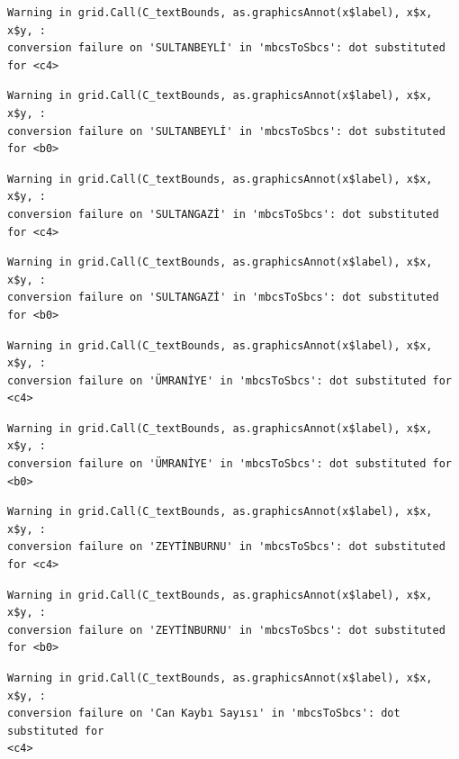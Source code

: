 \documentclass[
  11pt,
  a4paper,
  DIV=11,
  numbers=noendperiod]{scrartcl}
\begin{document}
\begin{verbatim}
Warning in grid.Call(C_textBounds, as.graphicsAnnot(x$label), x$x, x$y, :
conversion failure on 'SULTANBEYLİ' in 'mbcsToSbcs': dot substituted for <c4>
\end{verbatim}

\begin{verbatim}
Warning in grid.Call(C_textBounds, as.graphicsAnnot(x$label), x$x, x$y, :
conversion failure on 'SULTANBEYLİ' in 'mbcsToSbcs': dot substituted for <b0>
\end{verbatim}

\begin{verbatim}
Warning in grid.Call(C_textBounds, as.graphicsAnnot(x$label), x$x, x$y, :
conversion failure on 'SULTANGAZİ' in 'mbcsToSbcs': dot substituted for <c4>
\end{verbatim}

\begin{verbatim}
Warning in grid.Call(C_textBounds, as.graphicsAnnot(x$label), x$x, x$y, :
conversion failure on 'SULTANGAZİ' in 'mbcsToSbcs': dot substituted for <b0>
\end{verbatim}

\begin{verbatim}
Warning in grid.Call(C_textBounds, as.graphicsAnnot(x$label), x$x, x$y, :
conversion failure on 'ÜMRANİYE' in 'mbcsToSbcs': dot substituted for <c4>
\end{verbatim}

\begin{verbatim}
Warning in grid.Call(C_textBounds, as.graphicsAnnot(x$label), x$x, x$y, :
conversion failure on 'ÜMRANİYE' in 'mbcsToSbcs': dot substituted for <b0>
\end{verbatim}

\begin{verbatim}
Warning in grid.Call(C_textBounds, as.graphicsAnnot(x$label), x$x, x$y, :
conversion failure on 'ZEYTİNBURNU' in 'mbcsToSbcs': dot substituted for <c4>
\end{verbatim}

\begin{verbatim}
Warning in grid.Call(C_textBounds, as.graphicsAnnot(x$label), x$x, x$y, :
conversion failure on 'ZEYTİNBURNU' in 'mbcsToSbcs': dot substituted for <b0>
\end{verbatim}

\begin{verbatim}
Warning in grid.Call(C_textBounds, as.graphicsAnnot(x$label), x$x, x$y, :
conversion failure on 'Can Kaybı Sayısı' in 'mbcsToSbcs': dot substituted for
<c4>
\end{verbatim}
\end{document}
